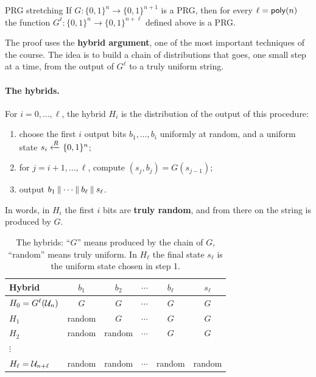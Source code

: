 \begin{framedthm}[label={thm:stretch}]{PRG stretching}
  If $G : \{0,1\}^n \to \{0,1\}^{n+1}$ is a PRG, then for every $\ell = \mathsf{poly}(n)$ the function $G^\ell : \{0,1\}^n \to \{0,1\}^{n+\ell}$ defined above is a PRG.
\end{framedthm}

The proof uses the \textbf{hybrid argument}, one of the most important techniques of the course. The idea is to build a chain of distributions that goes, one small step at a time, from the output of $G^\ell$ to a truly uniform string.

\paragraph{The hybrids.} For $i = 0, \ldots, \ell$, the hybrid $H_i$ is the distribution of the output of this procedure:
\begin{enumerate}
  \item choose the first $i$ output bits $b_1, \ldots, b_i$ uniformly at random, and a uniform state $s_i \xleftarrow{R} \{0,1\}^n$;
  \item for $j = i+1, \ldots, \ell$, compute $(s_j, b_j) = G(s_{j-1})$;
  \item output $b_1 \mathbin{\Vert} \cdots \mathbin{\Vert} b_\ell \mathbin{\Vert} s_\ell$.
\end{enumerate}
In words, in $H_i$ the first $i$ bits are \textbf{truly random}, and from there on the string is produced by $G$.

\begin{table}[H]
  \centering
  \small
  \begin{tabular}{lccccc}
    \toprule
    \textbf{Hybrid} & $b_1$ & $b_2$ & $\cdots$ & $b_\ell$ & $s_\ell$ \\
    \midrule
    $H_0 = G^\ell(\mathcal{U}_{n})$ & $G$ & $G$ & $\cdots$ & $G$ & $G$ \\
    $H_1$ & random & $G$ & $\cdots$ & $G$ & $G$ \\
    $H_2$ & random & random & $\cdots$ & $G$ & $G$ \\
    $\vdots$ & & & & & \\
    $H_\ell = \mathcal{U}_{n+\ell}$ & random & random & $\cdots$ & random & random \\
    \bottomrule
  \end{tabular}
  \caption{The hybrids: ``$G$'' means produced by the chain of $G$, ``random'' means truly uniform. In $H_\ell$ the final state $s_\ell$ is the uniform state chosen in step 1.}
\end{table}

